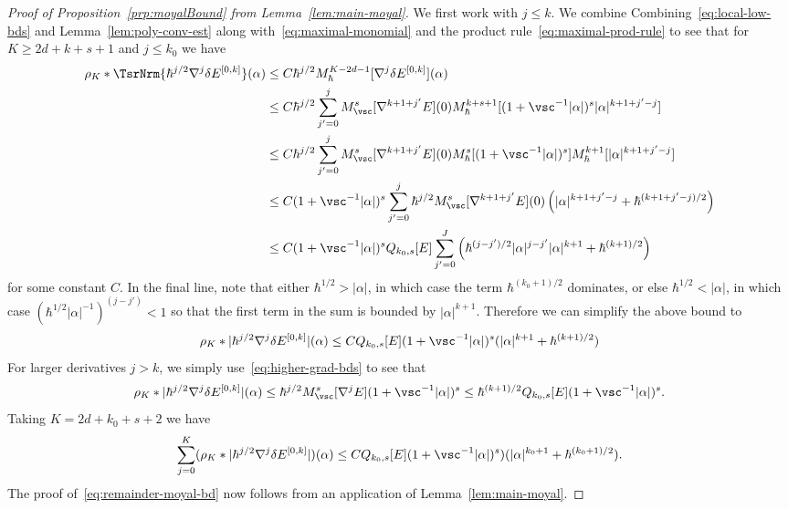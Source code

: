 \documentclass{article}
\numberwithin{equation}{section}
\begin{document}
\begin{proof}[Proof of Proposition~\ref{prp:moyalBound} from Lemma~\ref{lem:main-moyal}]
	We first work with $j\leq k$.  We combine
	Combining~\eqref{eq:local-low-bds}
	and Lemma~\ref{lem:poly-conv-est} along with~\eqref{eq:maximal-monomial} and
	the product rule~\eqref{eq:maximal-prod-rule}
	to see that for $K\geq 2d+k+s+1$ and $j\leq k_0$ we have
	\begin{equation}
		\begin{split}
			\rho_K \ast \TsrNrm{\hbar^{j/2}\nabla^j\delta E^{[0,k]}}(\alpha)
			&\leq C \hbar^{j/2}M_\hbar^{K-2d-1}[\nabla^j\delta E^{[0,k]}](\alpha) \\
			&\leq C \hbar^{j/2} \sum_{j'=0}^j M_\vsc^s[\nabla^{k+1+j'}E](0)
			M_\hbar^{k+s+1} [(1+\vsc^{-1}|\alpha|)^s|\alpha|^{k+1+j'-j}] \\ 
			&\leq C \hbar^{j/2} \sum_{j'=0}^j M_\vsc^s[\nabla^{k+1+j'}E](0)
			M_\hbar^{s} [(1+\vsc^{-1}|\alpha|)^s]
			M_\hbar^{k+1}[|\alpha|^{k+1+j'-j}] \\ 
			&\leq C (1+\vsc^{-1}|\alpha|)^s
			\sum_{j'=0}^j \hbar^{j/2}
			M_\vsc^s[\nabla^{k+1+j'} E](0)
			\left(|\alpha|^{k+1+j'-j} + \hbar^{(k+1+j'-j)/2}\right) \\
			&\leq C (1+\vsc^{-1}|\alpha|)^s Q_{k_0,s}[E]
			\sum_{j'=0}^J \left(\hbar^{(j-j')/2}|\alpha|^{j-j'}  |\alpha|^{k+1} + \hbar^{(k+1)/2}\right)
		\end{split}
	\end{equation}
    for some constant $C$.
	In the final line, note that either $\hbar^{1/2} > |\alpha|$, in which case the term $\hbar^{(k_0+1)/2}$ dominates,
	or else $\hbar^{1/2} < |\alpha|$, in which case $(\hbar^{1/2}|\alpha|^{-1})^{(j-j')} < 1$ so that the first
	term in the sum is bounded by $|\alpha|^{k+1}$.  Therefore we can simplify the above bound to
	\begin{equation}
		\rho_K \ast |\hbar^{j/2}\nabla^j \delta E^{[0,k]}|(\alpha)
		\leq C Q_{k_0,s}[E] (1+\vsc^{-1}|\alpha|)^s (|\alpha|^{k+1}+\hbar^{(k+1)/2})
	\end{equation}
	For larger derivatives $j>k$, we simply use~\eqref{eq:higher-grad-bds} to see that
	\[
	\rho_K \ast |\hbar^{j/2}\nabla^j \delta E^{[0,k]}|(\alpha) \leq
	\hbar^{j/2} M_\vsc^s[\nabla^j E] (1+\vsc^{-1}|\alpha|)^s
	\leq \hbar^{(k+1)/2} Q_{k_0,s}[E] (1+\vsc^{-1}|\alpha|)^s.
	\]
	Taking $K=2d+k_0+s+2$ we have
	\begin{equation}
		\label{eq:direct-bd}
		\sum_{j=0}^{K} (\rho_K \ast |\hbar^{j/2} \nabla^j  \delta E^{[0,k]}|)(\alpha)
		\leq C Q_{k_0,s}[E] (1+\vsc^{-1}|\alpha|)^s)(|\alpha|^{k_0+1} + \hbar^{(k_0+1)/2}).
	\end{equation}
	The proof of~\eqref{eq:remainder-moyal-bd} now follows from an application of Lemma~\ref{lem:main-moyal}.
	

\end{proof}
\end{document}
